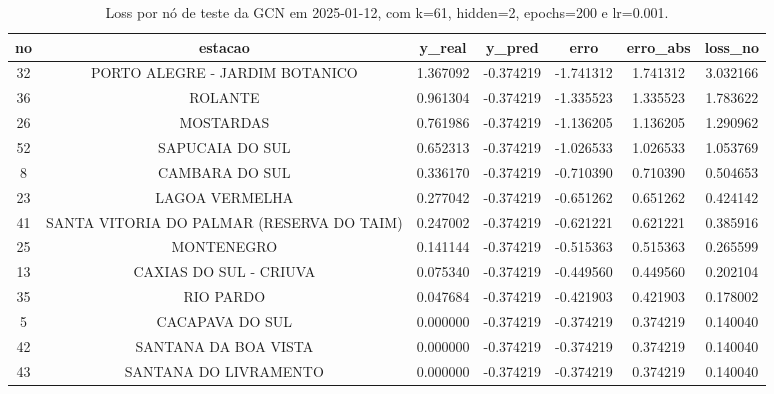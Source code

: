 \begin{table}[h]
\centering
\caption{Loss por nó de teste da GCN em 2025-01-12, com k=61, hidden=2, epochs=200 e lr=0.001.}
\label{tab:gcn_loss_nodes_k61_hidden2}
\begin{tabular}{ccccccc}
\toprule
no & estacao & y\_real & y\_pred & erro & erro\_abs & loss\_no \\
\midrule
32 & PORTO ALEGRE - JARDIM BOTANICO & 1.367092 & -0.374219 & -1.741312 & 1.741312 & 3.032166 \\
36 & ROLANTE & 0.961304 & -0.374219 & -1.335523 & 1.335523 & 1.783622 \\
26 & MOSTARDAS & 0.761986 & -0.374219 & -1.136205 & 1.136205 & 1.290962 \\
52 & SAPUCAIA DO SUL & 0.652313 & -0.374219 & -1.026533 & 1.026533 & 1.053769 \\
8 & CAMBARA DO SUL & 0.336170 & -0.374219 & -0.710390 & 0.710390 & 0.504653 \\
23 & LAGOA VERMELHA & 0.277042 & -0.374219 & -0.651262 & 0.651262 & 0.424142 \\
41 & SANTA VITORIA DO PALMAR (RESERVA DO TAIM) & 0.247002 & -0.374219 & -0.621221 & 0.621221 & 0.385916 \\
25 & MONTENEGRO & 0.141144 & -0.374219 & -0.515363 & 0.515363 & 0.265599 \\
13 & CAXIAS DO SUL - CRIUVA & 0.075340 & -0.374219 & -0.449560 & 0.449560 & 0.202104 \\
35 & RIO PARDO & 0.047684 & -0.374219 & -0.421903 & 0.421903 & 0.178002 \\
5 & CACAPAVA DO SUL & 0.000000 & -0.374219 & -0.374219 & 0.374219 & 0.140040 \\
42 & SANTANA DA BOA VISTA & 0.000000 & -0.374219 & -0.374219 & 0.374219 & 0.140040 \\
43 & SANTANA DO LIVRAMENTO & 0.000000 & -0.374219 & -0.374219 & 0.374219 & 0.140040 \\
\bottomrule
\end{tabular}
\end{table}
